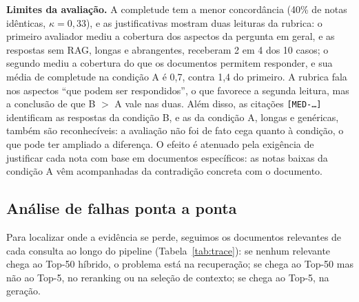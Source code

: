 \documentclass[10pt,a4paper]{article}
\begin{document}
\textbf{Limites da avaliação.} A completude tem a menor concordância (40\% de notas idênticas, $\kappa = 0{,}33$), e as justificativas mostram duas leituras da rubrica: o primeiro avaliador mediu a cobertura dos aspectos da pergunta em geral, e as respostas sem RAG, longas e abrangentes, receberam 2 em 4 dos 10 casos; o segundo mediu a cobertura do que os documentos permitem responder, e sua média de completude na condição A é 0,7, contra 1,4 do primeiro. A rubrica fala nos aspectos ``que podem ser respondidos'', o que favorece a segunda leitura, mas a conclusão de que B $>$ A vale nas duas. Além disso, as citações \texttt{[MED-\dots]} identificam as respostas da condição B, e as da condição A, longas e genéricas, também são reconhecíveis: a avaliação não foi de fato cega quanto à condição, o que pode ter ampliado a diferença. O efeito é atenuado pela exigência de justificar cada nota com base em documentos específicos: as notas baixas da condição A vêm acompanhadas da contradição concreta com o documento.

\subsection{Análise de falhas ponta a ponta}
\label{sec:res-falhas}

Para localizar onde a evidência se perde, seguimos os documentos relevantes de cada consulta ao longo do pipeline (Tabela~\ref{tab:trace}): se nenhum relevante chega ao Top-50 híbrido, o problema está na recuperação; se chega ao Top-50 mas não ao Top-5, no reranking ou na seleção de contexto; se chega ao Top-5, na geração.
\end{document}
